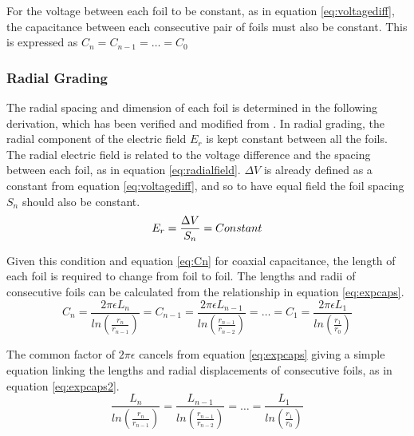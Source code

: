 For the voltage between each foil to be constant, as in equation \ref{eq:voltagediff}, the capacitance between each consecutive pair of foils must also be constant. This is expressed as $C_n = C_{n-1} = \dots = C_0$

\subsubsection{Radial Grading} \label{Section:RadialGrading}
The radial spacing and dimension of each foil is determined in the following derivation, which has been verified and modified from \cite{kuffel2000high}.
In radial grading, the radial component of the electric field $E_r$ is kept constant between all the foils.
The radial electric field is related to the voltage difference and the spacing between each foil, as in equation \ref{eq:radialfield}. $\Delta V$ is already defined as a constant from equation \ref{eq:voltagediff}, and so to have equal field the foil spacing $S_n$ should also be constant. 
\begin{equation}
   \label{eq:radialfield}
   E_r = \displaystyle\displaystyle\frac{\Delta V}{S_n} = Constant
\end{equation}

Given this condition and equation \ref{eq:Cn} for coaxial capacitance, the length of each foil is required to change from foil to foil.
The lengths and radii of consecutive foils can be calculated from the relationship in equation \ref{eq:expcaps}.
\begin{equation}
   \label{eq:expcaps}
   C_n = \displaystyle\frac{2\pi\epsilon L_{n}}{ln(\displaystyle\frac{r_{n}}{r_{n-1}})} = C_{n-1} = \displaystyle\frac{2\pi\epsilon L_{n-1}}{ln(\displaystyle\frac{r_{n-1}}{r_{n-2}})} = \dots = C_{1} = \displaystyle\frac{2\pi\epsilon L_{1}}{ln(\displaystyle\frac{r_{1}}{r_{0}})}
\end{equation}

The common factor of $2\pi\epsilon$ cancels from equation \ref{eq:expcaps} giving a simple equation linking the lengths and radial displacements of consecutive foils, as in equation \ref{eq:expcaps2}.
\begin{equation}
   \label{eq:expcaps2}
   \displaystyle\frac{L_{n}}{ln(\displaystyle\frac{r_{n}}{r_{n-1}})} = \displaystyle\frac{ L_{n-1}}{ln(\displaystyle\frac{r_{n-1}}{r_{n-2}})} = \dots = \displaystyle\frac{ L_{1}}{ln(\displaystyle\frac{r_{1}}{r_{0}})}
\end{equation}

